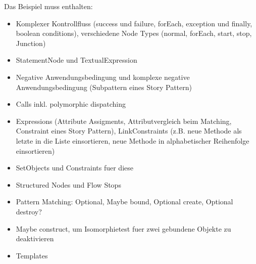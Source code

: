 Das Beispiel muss enthalten:
\begin{itemize}
  \item Komplexer Kontrollfluss (success und failure, forEach, exception und finally, boolean conditions), verschiedene Node Types (normal, forEach, start, stop, Junction)
  \item StatementNode und TextualExpression
  \item Negative Anwendungsbedingung und komplexe negative Anwendungsbedingung (Subpattern eines Story Pattern)
  \item Calls inkl. polymorphic dispatching
  \item Expressions (Attribute Assigments, Attributvergleich beim Matching, Constraint eines Story Pattern), LinkConstraints (z.B. neue Methode als letzte in die Liste einsortieren, neue Methode in alphabetischer Reihenfolge einsortieren)
  \item SetObjects und Constraints fuer diese
  \item Structured Nodes und Flow Stops
  \item Pattern Matching: Optional, Maybe bound, Optional create, Optional destroy?
  \item Maybe construct, um Isomorphietest fuer zwei gebundene Objekte zu deaktivieren
  \item Templates
\end{itemize}